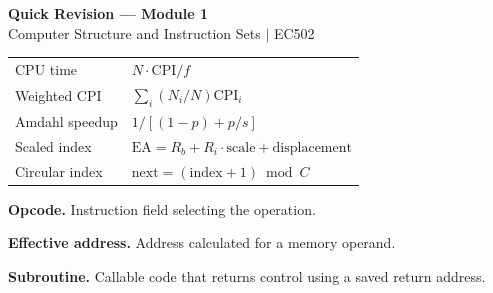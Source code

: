 \documentclass[12pt,a4paper]{article}
\renewcommand{\arraystretch}{1.45}
\begin{document}
\newpage
\begin{center}
  {\large\bfseries\color{myred} Quick Revision --- Module 1}\\[3pt]
  {\small\color{mydark} Computer Structure and Instruction Sets $|$ EC502}
\end{center}
\noindent{\color{myred}\rule{\linewidth}{1.2pt}}
\begin{tcolorbox}[formulabox,title={Key Formulas at a Glance}]
\renewcommand{\arraystretch}{1.35}
\begin{tabularx}{\linewidth}{B{5.0cm}Y}
CPU time & $N\cdot\mathrm{CPI}/f$ \\[3pt]
Weighted CPI & $\sum_i(N_i/N)\mathrm{CPI}_i$ \\[3pt]
Amdahl speedup & $1/[(1-p)+p/s]$ \\[3pt]
Scaled index & $\mathrm{EA}=R_b+R_i\cdot\text{scale}+\text{displacement}$ \\[3pt]
Circular index & $\mathrm{next}=(\mathrm{index}+1)\bmod C$ \\[3pt]
\end{tabularx}
\end{tcolorbox}
\begin{tcolorbox}[defbox,title={One-Line Definitions}]
\textbf{Opcode.} Instruction field selecting the operation.\par
\textbf{Effective address.} Address calculated for a memory operand.\par
\textbf{Subroutine.} Callable code that returns control using a saved return address.\par
\end{tcolorbox}
\end{document}
